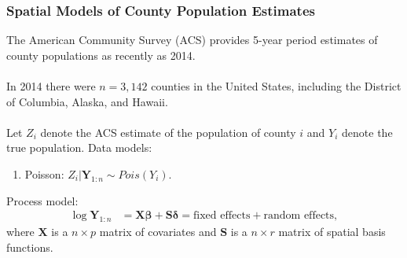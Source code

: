 \documentclass[xcolor=dvipsnames]{beamer}
\begin{document}
\begin{frame}
\frametitle{Spatial Models of County Population Estimates}
The American Community Survey (ACS) provides 5-year period estimates of county populations as recently as 2014.\\~\\
In 2014 there were $n=3,142$ counties in the United States, including the District of Columbia, Alaska, and Hawaii.\\~\\

 Let $Z_i$ denote the ACS estimate of the population of county $i$ and $Y_i$ denote the true population. Data models:
\begin{enumerate}
\item  Poisson: $Z_i|\bm{Y}_{1:n} \sim Pois\left(Y_i\right)$.
\end{enumerate}
Process model:
\begin{align*}
\log\bm{Y}_{1:n} &= \bm{X}\bm{\beta} + \bm{S}\bm{\delta} = \mbox{fixed effects} + \mbox{random effects},
\end{align*}
where $\bm{X}$ is a $n\times p$ matrix of covariates and $\bm{S}$ is a $n\times r$ matrix of spatial basis functions.
\end{frame}
\end{document}
